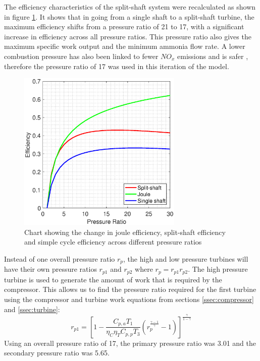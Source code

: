 \documentclass[11pt, oneside]{article}
\begin{document}
The efficiency characteristics of the split-shaft system were recalculated as shown in figure \ref{fig:twinefficiency}. It shows that in going from a single shaft to a split-shaft turbine, the maximum efficiency shifts from a pressure ratio of 21 to 17, with a significant increase in efficiency across all pressure ratios. This pressure ratio also gives the maximum specific work output and the minimum ammonia flow rate. A lower combustion pressure has also been linked to fewer $NO_x$ emissions and is safer \cite{junLi}, therefore the pressure ratio of 17 was used in this iteration of the model. 
\begin{figure} [h]
\centering
\includegraphics[width=0.7\textwidth]{./pictures/efficiencyPT.eps}
  \caption{Chart showing the change in joule efficiency, split-shaft efficiency and simple cycle efficiency across different pressure ratios} \label{fig:twinefficiency}
  \end{figure}
  
Instead of one overall pressure ratio $r_p$, the high and low pressure turbines will have their own pressure ratios $r_{p1}$ and $r_{p2}$ where $r_p = r_{p1} r_{p2}$. The high pressure turbine is used to generate the amount of work that is required by the compressor. This allows us to find the pressure ratio required for the first turbine using the compressor and turbine work equations from sections \ref{ssec:compressor} and \ref{ssec:turbine}:
\begin{equation}
r_{p1} = [1-\frac{C_{p, a} T_1}{\eta_C \eta_T C_{p, p} T_3} (r_p^\frac{\gamma -1}{\gamma}-1)]^{\frac{\gamma}{1-\gamma}}
\end{equation} %
Using an overall pressure ratio of 17, the primary pressure ratio was 3.01 and the secondary pressure ratio was 5.65.
\end{document}
